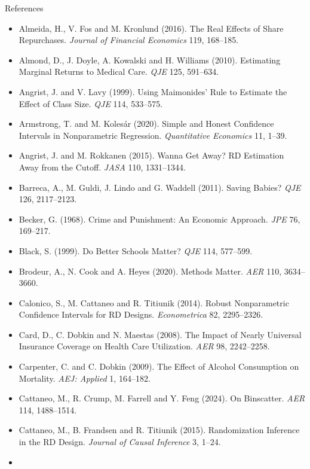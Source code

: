 \documentclass[
  11pt,
  ignorenonframetext,
  aspectratio=169,
]{beamer}
\providecommand{\tightlist}{%
  \setlength{\itemsep}{0pt}\setlength{\parskip}{0pt}}
\begin{document}
\begin{frame}{References}
\protect{}\label{references}
\tiny

\begin{itemize}
\tightlist
\item
  Almeida, H., V. Fos and M. Kronlund (2016). The Real Effects of Share
  Repurchases. \emph{Journal of Financial Economics} 119, 168--185.
\item
  Almond, D., J. Doyle, A. Kowalski and H. Williams (2010). Estimating
  Marginal Returns to Medical Care. \emph{QJE} 125, 591--634.
\item
  Angrist, J. and V. Lavy (1999). Using Maimonides' Rule to Estimate the
  Effect of Class Size. \emph{QJE} 114, 533--575.
\item
  Armstrong, T. and M. Kolesár (2020). Simple and Honest Confidence
  Intervals in Nonparametric Regression. \emph{Quantitative Economics}
  11, 1--39.
\item
  Angrist, J. and M. Rokkanen (2015). Wanna Get Away? RD Estimation Away
  from the Cutoff. \emph{JASA} 110, 1331--1344.
\item
  Barreca, A., M. Guldi, J. Lindo and G. Waddell (2011). Saving Babies?
  \emph{QJE} 126, 2117--2123.
\item
  Becker, G. (1968). Crime and Punishment: An Economic Approach.
  \emph{JPE} 76, 169--217.
\item
  Black, S. (1999). Do Better Schools Matter? \emph{QJE} 114, 577--599.
\item
  Brodeur, A., N. Cook and A. Heyes (2020). Methods Matter. \emph{AER}
  110, 3634--3660.
\item
  Calonico, S., M. Cattaneo and R. Titiunik (2014). Robust Nonparametric
  Confidence Intervals for RD Designs. \emph{Econometrica} 82,
  2295--2326.
\item
  Card, D., C. Dobkin and N. Maestas (2008). The Impact of Nearly
  Universal Insurance Coverage on Health Care Utilization. \emph{AER}
  98, 2242--2258.
\item
  Carpenter, C. and C. Dobkin (2009). The Effect of Alcohol Consumption
  on Mortality. \emph{AEJ: Applied} 1, 164--182.
\item
  Cattaneo, M., R. Crump, M. Farrell and Y. Feng (2024). On Binscatter.
  \emph{AER} 114, 1488--1514.
\item
  Cattaneo, M., B. Frandsen and R. Titiunik (2015). Randomization
  Inference in the RD Design. \emph{Journal of Causal Inference} 3,
  1--24.
\item

\end{itemize}
\end{frame}
\end{document}
